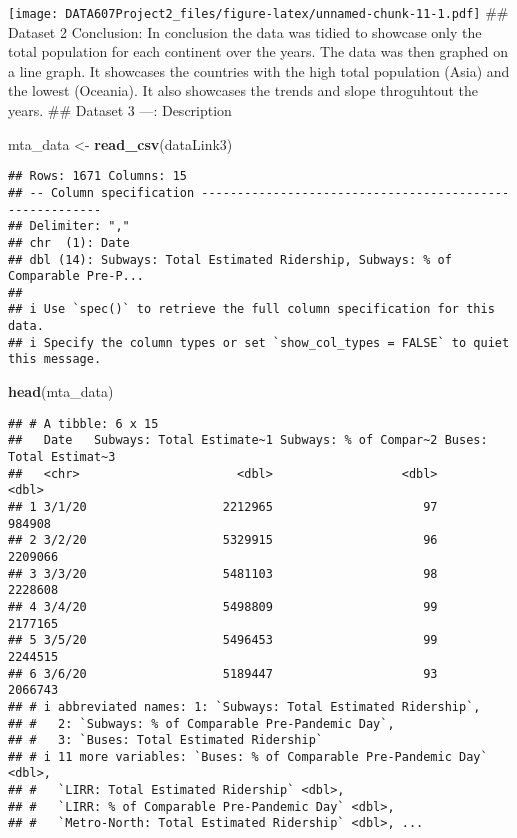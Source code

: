 \documentclass[
]{article}
\newenvironment{Shaded}{\begin{snugshade}}{\end{snugshade}}
\newcommand{\FunctionTok}[1]{\textcolor[rgb]{0.13,0.29,0.53}{\textbf{#1}}}
\newcommand{\NormalTok}[1]{#1}
\newcommand{\OtherTok}[1]{\textcolor[rgb]{0.56,0.35,0.01}{#1}}
\begin{document}
\texttt{[image: DATA607Project2\_files/figure-latex/unnamed-chunk-11-1.pdf]}
\#\# Dataset 2 Conclusion: In conclusion the data was tidied to showcase
only the total population for each continent over the years. The data
was then graphed on a line graph. It showcases the countries with the
high total population (Asia) and the lowest (Oceania). It also showcases
the trends and slope throguhtout the years. \#\# Dataset 3 ---:
Description

\begin{Shaded}
\begin{Highlighting}[]
\NormalTok{mta\_data }\OtherTok{\textless{}{-}} \FunctionTok{read\_csv}\NormalTok{(dataLink3)}
\end{Highlighting}
\end{Shaded}

\begin{verbatim}
## Rows: 1671 Columns: 15
## -- Column specification --------------------------------------------------------
## Delimiter: ","
## chr  (1): Date
## dbl (14): Subways: Total Estimated Ridership, Subways: % of Comparable Pre-P...
## 
## i Use `spec()` to retrieve the full column specification for this data.
## i Specify the column types or set `show_col_types = FALSE` to quiet this message.
\end{verbatim}

\begin{Shaded}
\begin{Highlighting}[]
\FunctionTok{head}\NormalTok{(mta\_data)}
\end{Highlighting}
\end{Shaded}

\begin{verbatim}
## # A tibble: 6 x 15
##   Date   Subways: Total Estimate~1 Subways: % of Compar~2 Buses: Total Estimat~3
##   <chr>                      <dbl>                  <dbl>                  <dbl>
## 1 3/1/20                   2212965                     97                 984908
## 2 3/2/20                   5329915                     96                2209066
## 3 3/3/20                   5481103                     98                2228608
## 4 3/4/20                   5498809                     99                2177165
## 5 3/5/20                   5496453                     99                2244515
## 6 3/6/20                   5189447                     93                2066743
## # i abbreviated names: 1: `Subways: Total Estimated Ridership`,
## #   2: `Subways: % of Comparable Pre-Pandemic Day`,
## #   3: `Buses: Total Estimated Ridership`
## # i 11 more variables: `Buses: % of Comparable Pre-Pandemic Day` <dbl>,
## #   `LIRR: Total Estimated Ridership` <dbl>,
## #   `LIRR: % of Comparable Pre-Pandemic Day` <dbl>,
## #   `Metro-North: Total Estimated Ridership` <dbl>, ...
\end{verbatim}
\end{document}
